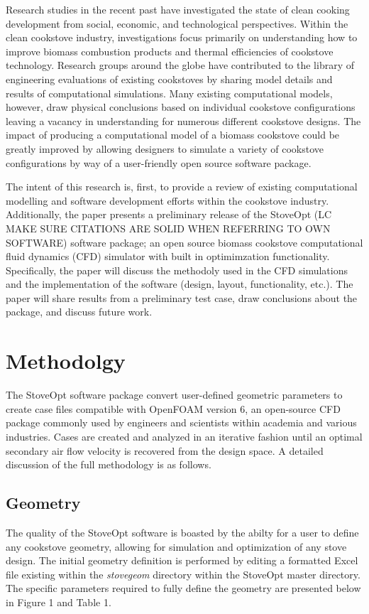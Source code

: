 \documentclass[3p,times,twocolumn]{elsarticle}
\begin{document}
Research studies in the recent past have investigated the state of clean cooking development from social, economic, and technological perspectives. Within the clean cookstove industry, investigations focus primarily on understanding how to improve biomass combustion products and thermal efficiencies of cookstove technology. Research groups around the globe have contributed to the library of engineering evaluations of existing cookstoves by sharing model details and results of computational simulations. Many existing computational models, however, draw physical conclusions based on individual cookstove configurations leaving a vacancy in understanding for numerous different cookstove designs. The impact of producing a computational model of a biomass cookstove could be greatly improved by allowing designers to simulate a variety of cookstove configurations by way of a user-friendly open source software package. 

The intent of this research is, first, to provide a review of existing computational modelling and software development efforts within the cookstove industry. Additionally, the paper presents a preliminary release of the StoveOpt (LC MAKE SURE CITATIONS ARE SOLID WHEN REFERRING TO OWN SOFTWARE) software package; an open source biomass cookstove computational fluid dynamics (CFD) simulator with built in optimimzation functionality. Specifically, the paper will discuss the methodoly used in the CFD simulations and the implementation of the software (design, layout, functionality, etc.). The paper will share results from a preliminary test case, draw conclusions about the package, and discuss future work.

\section{Methodolgy}
The StoveOpt software package convert user-defined geometric parameters to create case files compatible with OpenFOAM version 6, an open-source CFD package commonly used by engineers and scientists within academia and various industries. Cases are created and analyzed in an iterative fashion until an optimal secondary air flow velocity is recovered from the design space. A detailed discussion of the full methodology is as follows.   

\subsection{Geometry}
The quality of the StoveOpt software is boasted by the abilty for a user to define any cookstove geometry, allowing for simulation and optimization of any stove design. The initial geometry definition is performed by editing a formatted Excel file existing within the \textit{stovegeom} directory within the StoveOpt master directory. The specific parameters required to fully define the geometry are presented below in Figure 1 and Table 1.
\end{document}
